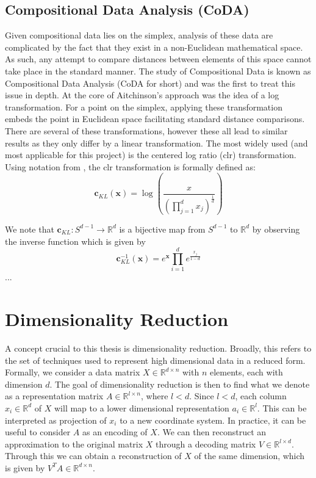 
\subsection{Compositional Data Analysis (CoDA)}
\label{coda}
Given compositional data lies on the simplex, analysis of these data are complicated by the fact that they exist in a non-Euclidean mathematical space. As such, any attempt to compare distances between elements of this space cannot take place in the standard manner. The study of Compositional Data is known as Compositional Data Analysis (CoDA for short) and \cite{Aitchison1982} was the first to treat this issue in depth. At the core of Aitchinson's approach was the idea of a log transformation. For a point on the simplex, applying these transformation embeds the point in Euclidean space facilitating standard distance comparisons. There are several of these transformations, however these all lead to similar results as they only differ by a linear transformation. The most widely used (and most applicable for this project) is the centered log ratio (clr) transformation. Using notation from \cite{Avalos2018}, the clr transformation is formally defined as: $$\mathbf{c}_{KL}(\mathbf{x}) = \log \left(\frac{x}{(\prod_{j=1}^d x_j)^{\frac{1}{d}}}\right)$$  

We note that $\mathbf{c}_{KL} : S^{d-1} \to  \mathbb{R}^d$ is a bijective map from $S^{d-1}$ to  $\mathbb{R}^d$ by observing the inverse function which is given by 
$$\mathbf{c}_{KL}^{-1}(\mathbf{x}) = e^\mathbf{x} \prod_{i=1}^d e^{\frac{x_j}{1-d}}$$ ...

\section{Dimensionality Reduction}
\label{sec:dimred}

A concept crucial to this thesis is dimensionality reduction. Broadly, this refers to the set of techniques used to represent high dimensional data in a reduced form. Formally, we consider a data matrix $X \in \mathbb{R}^{d \times n}$ with $n$ elements, each with dimension $d$. The goal of dimensionality reduction is then to find what we denote as a representation matrix $A \in \mathbb{R}^{l \times n}$, where $l < d$. Since $l < d$, each column $x_i \in \mathbb{R}^d$ of $X$ will map to a lower dimensional representation $a_i \in \mathbb{R}^l$. This can be interpreted as projection of $x_i$ to a new coordinate system. In practice, it can be useful to consider $A$ as an encoding of $X$. We can then reconstruct an approximation to the original matrix $X$ through a decoding matrix $V \in \mathbb{R}^{l \times d}$. Through this we can obtain a reconstruction of $X$ of the same dimension, which is given by $V^TA \in \mathbb{R}^{d \times n}$. 

